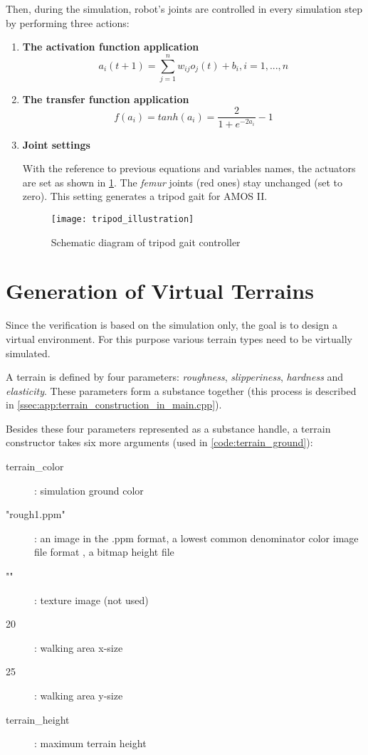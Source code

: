 Then, during the simulation, robot's joints are controlled in every simulation step by performing three actions:

\begin{enumerate}
\item \textbf{The activation function application}
\begin{equation}
a_i(t+1) = \displaystyle\sum_{j=1}^{n} w_{ij}o_j(t) + b_i, i = 1, ..., n
\end{equation}

\item \textbf{The transfer function application}
\begin{equation}
f(a_i) = tanh(a_i) = \frac{2}{1+e^{-2a_i}} - 1
\end{equation}

\item \textbf{Joint settings}

With the reference to previous equations and variables names, the actuators are set as shown in \cref{img:tripod_illustration}. The \textit{femur} joints (red ones) stay unchanged (set to zero). This setting generates a tripod gait for AMOS II.

\begin{figure}[H]
  \centering
  \texttt{[image: tripod\_illustration]}
  \caption{Schematic diagram of tripod gait controller}
  \label{img:tripod_illustration}
\end{figure}
\end{enumerate}

\section{Generation of Virtual Terrains} \label{sec:generation_of_virtual_terrains}
Since the verification is based on the simulation only, the goal is to design a virtual environment. For this purpose various terrain types need to be virtually simulated.

A terrain is defined by four parameters: \textit{roughness}, \textit{slipperiness}, \textit{hardness} and \textit{elasticity}. These parameters form a substance together (this process is described in \cref{ssec:app:terrain_construction_in_main.cpp}).

Besides these four parameters represented as a substance handle, a terrain constructor takes six more arguments (used in \cref{code:terrain_ground}):

\begin{description}
\item[terrain\_color] : simulation ground color
\item["rough1.ppm"] : an image in the .ppm format, a lowest common denominator color image file format \citep{misc:ppm}, a bitmap height file
\item[""] : texture image (not used)
\item[20] : walking area x-size 
\item[25] : walking area y-size
\item[terrain\_height] : maximum terrain height
\end{description}

